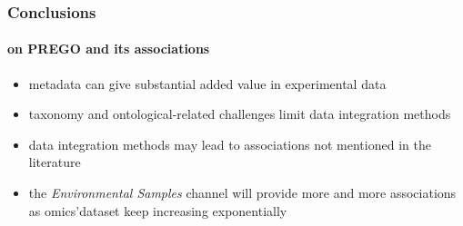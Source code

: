 \documentclass{beamer}
\begin{document}
   \begin{frame}
      \frametitle{Conclusions}
      \framesubtitle{on PREGO and its associations}

      \small
      \begin{itemize}
         \item metadata can give substantial added value in experimental data
         \item taxonomy and ontological-related challenges limit data integration methods
         \item data integration methods may lead to associations not mentioned in the literature
         \item the \textit{Environmental Samples} channel will provide more and more associations as 
         omics'dataset keep increasing exponentially
      \end{itemize}
   \end{frame}
\end{document}
